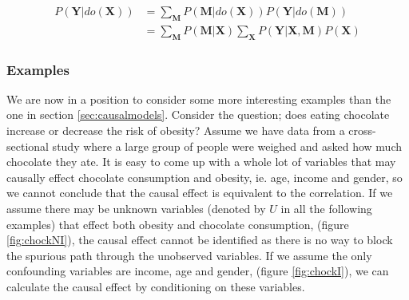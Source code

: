 \documentclass[11pt,a4paper]{article}
\begin{document}
\begin{equation}
\begin {aligned}
P(\boldsymbol{Y}|do(\boldsymbol{X})) & = \sum_{\boldsymbol{M}}{P(\boldsymbol{M}|do(\boldsymbol{X}))P(\boldsymbol{Y}|do(\boldsymbol{M}))} \\
&= \sum_{\boldsymbol{M}}{P(\boldsymbol{M}|\boldsymbol{X})} \sum_{\boldsymbol{X}}P(\boldsymbol{Y}|\boldsymbol{X},\boldsymbol{M})P(\boldsymbol{X}) 
\end {aligned}
\end{equation}

\subsubsection{Examples}

We are now in a position to consider some more interesting examples than the one in section \ref{sec:causalmodels}. Consider the question; does eating chocolate increase or decrease the risk of obesity? Assume we have data from a cross-sectional study where a large group of people were weighed and asked how much chocolate they ate. It is easy to come up with a whole lot of variables that may causally effect chocolate consumption and obesity, ie. age, income and gender, so we cannot conclude that the causal effect is equivalent to the correlation. If we assume there may be unknown variables (denoted by $U$ in all the following examples) that effect both obesity and chocolate consumption, (figure \ref{fig:chockNI}), the causal effect cannot be identified as there is no way to block the spurious path through the unobserved variables. If we assume the only confounding variables are income, age and gender, (figure \ref{fig:chockI}), we can calculate the causal effect by conditioning on these variables.  
\end{document}
